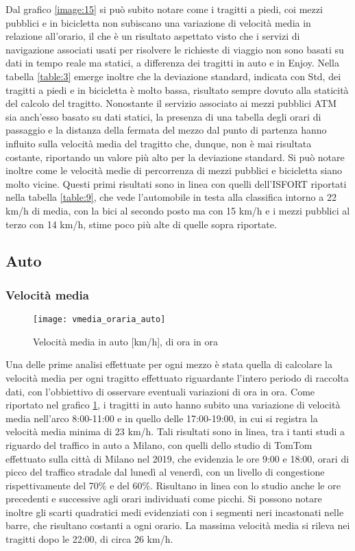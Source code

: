 Dal grafico \ref{image:15} si può subito notare come i tragitti a piedi, coi mezzi pubblici e in bicicletta non subiscano una variazione di velocità media in relazione all'orario, il che è un risultato aspettato visto che i servizi di navigazione associati usati per risolvere le richieste di viaggio non sono basati su dati in tempo reale ma statici, a differenza dei tragitti in auto e in Enjoy. Nella tabella \ref{table:3} emerge inoltre che la deviazione standard, indicata con Std, dei tragitti a piedi e in bicicletta è molto bassa, risultato sempre dovuto alla staticità del calcolo del tragitto. Nonostante il servizio associato ai mezzi pubblici ATM sia anch'esso basato su dati statici, la presenza di una tabella degli orari di passaggio e la distanza della fermata del mezzo dal punto di partenza hanno influito sulla velocità media del tragitto che, dunque, non è mai risultata costante, riportando un valore più alto per la deviazione standard. Si può notare inoltre come le velocità medie di percorrenza di mezzi pubblici e bicicletta siano molto vicine. Questi primi risultati sono in linea con quelli dell'ISFORT riportati nella tabella \ref{table:9}, che vede l'automobile in testa alla classifica intorno a 22 km/h di media, con la bici al secondo posto ma con 15 km/h e i mezzi pubblici al terzo con 14 km/h, stime poco più alte di quelle sopra riportate.

\subsection{Auto}

\subsubsection{Velocità media}

\begin{figure}[H]
\texttt{[image: vmedia\_oraria\_auto]}
\caption{Velocità media in auto [km/h], di ora in ora}
\label{image:3}
\end{figure}

Una delle prime analisi effettuate per ogni mezzo è stata quella di calcolare la velocità media per ogni tragitto effettuato riguardante l'intero periodo di raccolta dati, con l'obbiettivo di osservare eventuali variazioni di ora in ora. Come riportato nel grafico \ref{image:3}, i tragitti in auto hanno subito una variazione di velocità media nell'arco 8:00-11:00 e in quello delle 17:00-19:00, in cui si registra la velocità media minima di 23 km/h. Tali risultati sono in linea, tra i tanti studi a riguardo del traffico in auto a Milano, con quelli dello studio di TomTom\cite{tomtomindexmilan} effettuato sulla città di Milano nel 2019, che evidenzia le ore 9:00 e 18:00, orari di picco del traffico stradale dal lunedì al venerdì, con un livello di congestione rispettivamente del 70\% e del 60\%. Risultano in linea con lo studio anche le ore precedenti e successive agli orari individuati come picchi. Si possono notare inoltre gli scarti quadratici medi evidenziati con i segmenti neri incastonati nelle barre, che risultano costanti a ogni orario. La massima velocità media si rileva nei tragitti dopo le 22:00, di circa 26 km/h.

